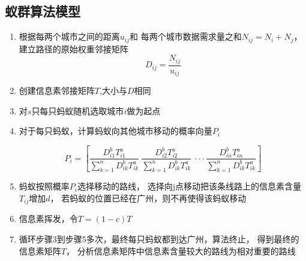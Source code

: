 \documentclass[UTF8,12pt]{ctexart}
\begin{document}
\subsection{蚁群算法模型}\label{YQSFMX}
\begin{enumerate}
    \item 根据每两个城市之间的距离$u_{ij}$和
          每两个城市数据需求量之和$N_{ij}=N_i+N_j$，建立路径的原始权重邻接矩阵
          $$D_{ij}=\frac{N_{ij}}{u_{ij}}$$
    \item 创建信息素邻接矩阵$T$,大小与$D$相同
    \item 对$s$只每只蚂蚁随机选取城市$i$做为起点
    \item 对于每只蚂蚁，计算蚂蚁向其他城市移动的概率向量$P_i$
          \begin{large}
              $$P_i=\left[\frac{D_{i1}^bT_{i1}^a}{\sum_{k=1}^n{D_{ik}^bT_{ik}^a}}~\frac{D_{i2}^bT_{i2}^a}{\sum_{k=1}^n{D_{ik}^bT_{ik}^a}}~··· \frac{D_{in}^bT_{in}^a}{\sum_{k=1}^n{D_{ik}^bT_{ik}^a}}\right]$$

          \end{large}
    \item 蚂蚁按照概率$P_i$选择移动的路线，
          选择向j点移动把该条线路上的信息素含量$T_{ij}$增加$d$，
          若蚂蚁的位置已经在广州，则不再使得该蚂蚁移动
    \item 信息素挥发，令$T=(1-c)T$
    \item 循环步骤3到步骤5多次，最终每只蚂蚁都到达广州，算法终止，
          得到最终的信息素矩阵$T$，
          分析信息素矩阵中信息素含量较大的路线为相对重要的路线
\end{enumerate}
\end{document}
